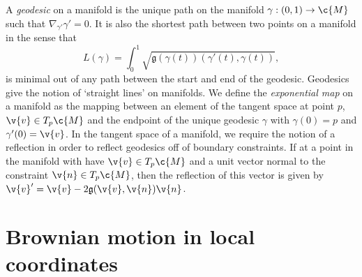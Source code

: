 A \emph{geodesic} on a manifold is the unique path on the manifold \(\gamma: (0,1) \to \c{M}\) such that $\nabla_{\gamma'}\gamma' = 0$.
It is also the shortest path between two points on a manifold in the sense that \[\textstyle{L(\gamma) = \int_0^1 \sqrt{\mathfrak{g}(\gamma(t))(\gamma'(t), \gamma(t))}, }\] is minimal out of any path between the start and end of the geodesic.
Geodesics give the notion of `straight lines' on manifolds.
We define the \emph{exponential map} on a manifold as the mapping between an element of the tangent space at point \(p\), \(\v{v}\in T_p\c{M}\) and the endpoint of the unique geodesic \(\gamma\) with \(\gamma(0) = p\) and \(\gamma'(0) = \v{v}\).
In the tangent space of a manifold, we require the notion of a reflection in order to reflect geodesics off of boundary constraints.
If at a point in the manifold with have \(\v{v}\in T_p\c{M}\) and a unit vector normal to the constraint \(\v{n}\in T_p\c{M}\), then the reflection of this vector is given by $\v{v}' = \v{v} - 2\mathfrak{g}(\v{v},\v{n}) \v{n}$.

\section{Brownian motion in local coordinates}
\label{sec:brownian}

